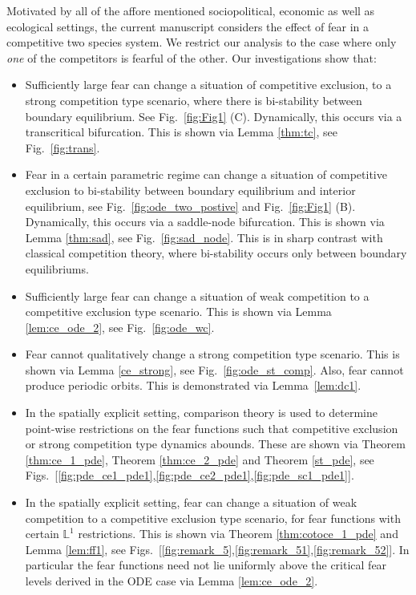 \documentclass[10pt]{amsart}
\theoremstyle{definition}
\begin{document}
Motivated by all of the affore mentioned sociopolitical, economic as well as ecological settings, the current manuscript considers the effect of fear in a competitive two species system. We restrict our analysis to the case where only \emph{one} of the competitors is fearful of the other. Our investigations show that:
 
 \begin{itemize}
 
 \item Sufficiently large fear can change a situation of competitive exclusion, to a strong competition type scenario, where there is bi-stability between boundary equilibrium. See Fig.~\ref{fig:Fig1} (C). Dynamically, this occurs via a transcritical bifurcation. This is shown via Lemma \ref{thm:tc}, see Fig.~\ref{fig:trans}.
 
 \item Fear in a certain parametric regime can change a situation of competitive exclusion to bi-stability between boundary equilibrium and interior equilibrium, see Fig.~\ref{fig:ode_two_postive} and Fig.~\ref{fig:Fig1} (B). Dynamically, this occurs via a saddle-node bifurcation. This is shown via Lemma \ref{thm:sad}, see Fig.~\ref{fig:sad_node}. This is in sharp contrast with classical competition theory, where bi-stability occurs only between boundary equilibriums.
 
 \item Sufficiently large fear can change a situation of weak competition to a competitive exclusion type scenario. This is shown via Lemma \ref{lem:ce_ode_2}, see Fig.~\ref{fig:ode_wc}.
 
 \item Fear cannot qualitatively change a strong competition type scenario. This is shown via Lemma \ref{ce_strong}, see Fig.~\ref{fig:ode_st_comp}.
 Also, fear cannot produce periodic orbits. This is demonstrated via Lemma~\ref{lem:dc1}.
 
 \item In the spatially explicit setting, comparison theory is used to determine point-wise restrictions on the fear functions such that competitive exclusion or strong competition type dynamics abounds. These are shown via Theorem \ref{thm:ce_1_pde}, Theorem \ref{thm:ce_2_pde} and Theorem \ref{st_pde}, see Figs.~[\ref{fig:pde_ce1_pde1},\ref{fig:pde_ce2_pde1},\ref{fig:pde_sc1_pde1}].
 
 
 \item In the spatially explicit setting, fear can change a situation of weak competition to a competitive exclusion type scenario, for fear functions with certain $\mathbb{L}^{1}$ restrictions. This is shown via Theorem \ref{thm:cotoce_1_pde} and Lemma \ref{lem:ff1}, see Figs.~[\ref{fig:remark_5},\ref{fig:remark_51},\ref{fig:remark_52}]. In particular the fear functions need not lie uniformly above the critical fear levels derived in the ODE case via Lemma \ref{lem:ce_ode_2}. 
 

\end{itemize}
\end{document}
